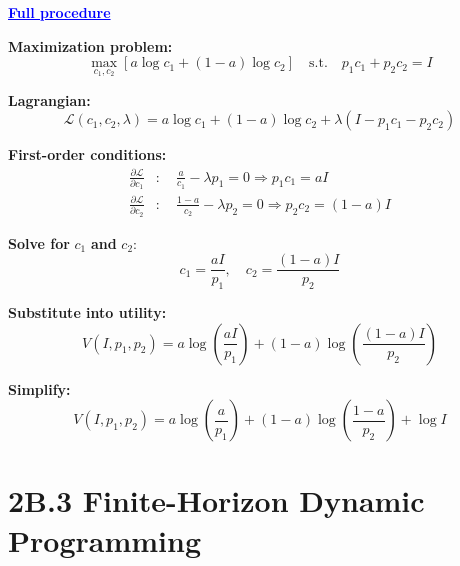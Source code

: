 \documentclass[12pt]{article}
\begin{document}
\textcolor{blue}{\textbf{\uline{Full procedure}}}

{\color{blue}
\textbf{Maximization problem:}
\[
\max_{c_1, c_2} \left[ a \log c_1 + (1 - a) \log c_2 \right]
\quad \text{s.t.} \quad p_1 c_1 + p_2 c_2 = I
\]

\textbf{Lagrangian:}
\[
\mathcal{L}(c_1, c_2, \lambda) = a \log c_1 + (1 - a) \log c_2 + \lambda (I - p_1 c_1 - p_2 c_2)
\]

\textbf{First-order conditions:}
\begin{align*}
\frac{\partial \mathcal{L}}{\partial c_1} &: \quad \frac{a}{c_1} - \lambda p_1 = 0
\Rightarrow p_1 c_1 = aI \\
\frac{\partial \mathcal{L}}{\partial c_2} &: \quad \frac{1 - a}{c_2} - \lambda p_2 = 0
\Rightarrow p_2 c_2 = (1 - a)I
\end{align*}

\textbf{Solve for } $c_1$ \textbf{ and } $c_2$:
\[
c_1 = \frac{aI}{p_1}, \quad c_2 = \frac{(1 - a)I}{p_2}
\]

\textbf{Substitute into utility:}
\[
V(I, p_1, p_2) = a \log \left( \frac{aI}{p_1} \right) + (1 - a) \log \left( \frac{(1 - a)I}{p_2} \right)
\]

\textbf{Simplify:}
\[
V(I, p_1, p_2) = a \log \left( \frac{a}{p_1} \right) + (1 - a) \log \left( \frac{1 - a}{p_2} \right) + \log I
\]
}

\section*{\noindent\textbf{2B.3 Finite-Horizon Dynamic Programming}}
\end{document}
